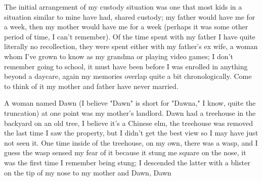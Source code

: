 \documentclass[12pt]{article}
\begin{document}
The initial arrangement of my custody situation was one that most kids in a situation similar to mine
    have had, shared custody; my father would have me for a week, then my mother would have me for a week
    (perhaps it was some other period of time, I can't remember).
Of the time spent with my father I have quite literally no recollection, they were
    spent either with my father's ex wife, a woman whom I've grown to know as my grandma or playing video
    games; I don't remember going to school, it must have been before I was enrolled in anything beyond a
    daycare, again my memories overlap quite a bit chronologically.
Come to think of it my mother and father have never married.

A woman named Dawn (I believe "Dawn" is short for "Dawna," I know, quite the truncation) at one point was
    my mother's landlord. Dawn had a treehouse in the backyard on an old tree, I believe it's a Chinese elm,
    the treehouse was removed the last time I saw the property, but I didn't get the best view so I may have
    just not seen it. One time inside of the treehouse, on my own, there was a wasp, and I guess the wasp
    sensed my fear of it because it stung me square on the nose, it was the first time I remember being
    stung; I descended the latter with a blister on the tip of my nose to my mother and Dawn, Dawn 
\end{document}
